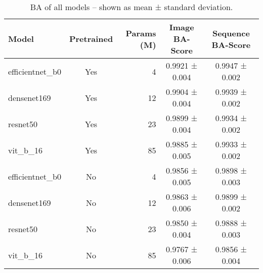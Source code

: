 \begin{table}[H]
\centering
\caption{\acs{BA} of all models -- shown as mean ± standard deviation.}
\label{tab:bal_acc_by_model}
\begin{tabular}{l c r c c}
\toprule
Model & Pretrained & Params (M) & Image BA-Score & Sequence BA-Score \\
\midrule
efficientnet\_b0 & Yes & 4 & 0.9921 ± 0.004 & 0.9947 ± 0.002 \\
densenet169 & Yes & 12 & 0.9904 ± 0.004 & 0.9939 ± 0.002 \\
resnet50 & Yes & 23 & 0.9899 ± 0.004 & 0.9934 ± 0.002 \\
vit\_b\_16 & Yes & 85 & 0.9885 ± 0.005 & 0.9933 ± 0.002 \\
\midrule
efficientnet\_b0 & No & 4 & 0.9856 ± 0.005 & 0.9898 ± 0.003 \\
densenet169 & No & 12 & 0.9863 ± 0.006 & 0.9899 ± 0.002 \\
resnet50 & No & 23 & 0.9850 ± 0.004 & 0.9888 ± 0.003 \\
vit\_b\_16 & No & 85 & 0.9767 ± 0.006 & 0.9856 ± 0.004 \\
\bottomrule
\end{tabular}
\end{table}